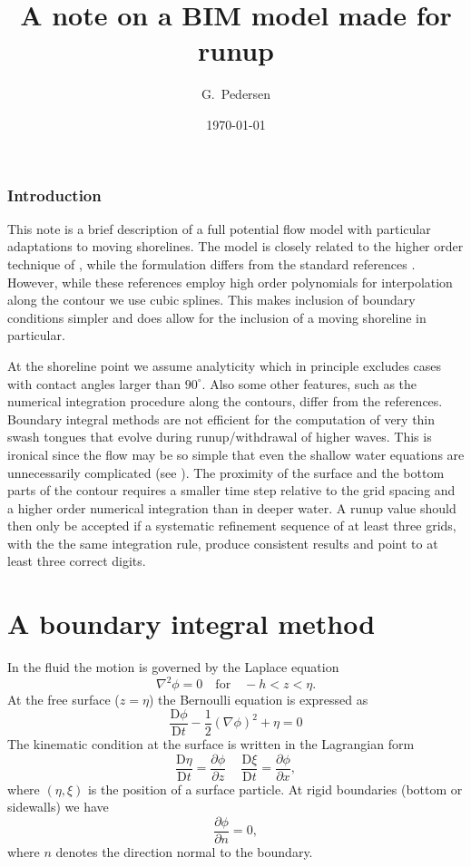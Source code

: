 \documentclass[11pt]{article}
\newcommand{\Mder}[1]{\frac{{\mathrm D}#1}{{\mathrm D}t} }
\newcommand{\half}{\frac{1}{2}}
\newcommand{\beq}{\begin{equation}}
\newcommand{\eeq}{\end{equation}}
\newcommand{\der}[2]{\frac{\partial #1}{\partial #2}}
\begin{document}
\title{A note on a BIM model made for runup}
\author{G.~Pedersen}
\date{\today }
\maketitle
\subsubsection{Introduction}
This note is a brief description of a full potential flow model with
particular adaptations to moving shorelines.
 The model is closely related to the
higher order technique of  \cite{Cooker:1990,Dold:1992}, while the formulation differs from the standard references \cite{Grilli:1990,Grilli:1994,Grilli:1997}. However, while these references employ high order polynomials for interpolation along the contour
we use 
cubic splines. This makes inclusion of boundary conditions simpler and does 
 allow for the inclusion of a moving shoreline in particular. 

At the shoreline point we 
assume analyticity which in principle excludes cases with contact angles 
larger than $90^\circ$. Also some other features, such as the numerical 
integration procedure along the contours, differ from the references. 
Boundary integral methods are not efficient for the computation of very thin swash tongues that evolve during runup/withdrawal of higher waves. This is ironical
since the flow may be so simple that even the shallow water equations are unnecessarily complicated (see \cite{Jensen:2003}). The proximity of the surface and 
the bottom parts of the contour requires a smaller time step relative to 
the grid spacing and a higher order numerical integration than in deeper water.
A runup value should then only be accepted if a systematic refinement sequence 
of at least three grids, with the the same integration rule, produce consistent results and point to at least three correct digits.      



\section{A boundary integral method}
In the fluid the motion is governed by the Laplace equation 
\[\nabla^2\phi=0\quad \mathrm{for}\quad -h<z<\eta.\]
At the free surface ($z=\eta$) the Bernoulli equation is
expressed as
\beq
\label{Bernoulli}
\Mder\phi -\half(\nabla\phi)^2+\eta=0
\eeq
The kinematic condition at the surface is written in the Lagrangian form
\[\Mder\eta=\der\phi z\,\quad \Mder\xi=\der\phi x,\]
where $(\eta,\xi)$ is the position of a surface particle.
At rigid boundaries (bottom or sidewalls) we have
\[\der\phi n=0,\] 
where $n$ denotes the direction normal to the boundary.
\end{document}
